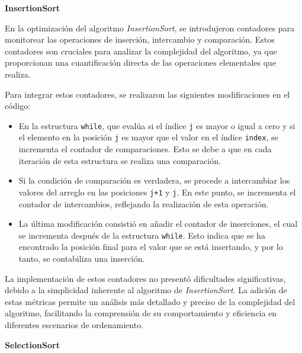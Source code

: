 \documentclass[12pt]{article}
\begin{document}
\textcolor[rgb]{0.13, 0.55, 0.13}{\textbf{InsertionSort}}
\par\vspace{0.4cm}
En la optimización del algoritmo \textit{InsertionSort}, se introdujeron contadores para monitorear las operaciones de inserción, intercambio y comparación. Estos contadores son cruciales para analizar la complejidad del algoritmo, ya que proporcionan una cuantificación directa de las operaciones elementales que realiza.

Para integrar estos contadores, se realizaron las siguientes modificaciones en el código:

\begin{itemize}
    \item En la estructura \texttt{while}, que evalúa si el índice \texttt{j} es mayor o igual a cero y si el elemento en la posición \texttt{j} es mayor que el valor en el índice \texttt{index}, se incrementa el contador de comparaciones. Esto se debe a que en cada iteración de esta estructura se realiza una comparación.
    \item Si la condición de comparación es verdadera, se procede a intercambiar los valores del arreglo en las posiciones \texttt{j+1} y \texttt{j}. En este punto, se incrementa el contador de intercambios, reflejando la realización de esta operación.
    \item La última modificación consistió en añadir el contador de inserciones, el cual se incrementa después de la estructura \texttt{while}. Esto indica que se ha encontrado la posición final para el valor que se está insertando, y por lo tanto, se contabiliza una inserción.
\end{itemize}

La implementación de estos contadores no presentó dificultades significativas, debido a la simplicidad inherente al algoritmo de \textit{InsertionSort}. La adición de estas métricas permite un análisis más detallado y preciso de la complejidad del algoritmo, facilitando la comprensión de su comportamiento y eficiencia en diferentes escenarios de ordenamiento.

\textcolor[rgb]{0.13, 0.55, 0.13}{\textbf{SelectionSort}}
\par\vspace{0.4cm}
\end{document}
